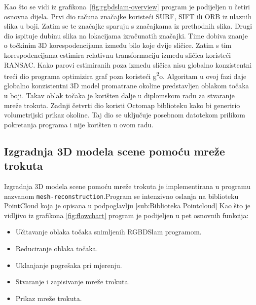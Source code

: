 
Kao što se vidi iz grafikona~\ref{fig:rgbdslam-overview} program je
podijeljen u četiri osnovna dijela. Prvi dio računa značajke koristeći
SURF, SIFT ili ORB iz ulaznih slika u boji. Zatim se te značajke sparuju
s značajkama iz prethodnih slika. Drugi dio ispituje dubinu slika na
lokacijama izračunatih značajki. Time dobiva znanje o točkinim 3D
korespodencijama između bilo koje dvije sličice. Zatim s tim
korespodencijama estimira relativnu transformaciju između sličica
koristeći RANSAC. Kako parovi estimiranih poza između sličica nisu
globalno konzistentni treći dio programa optimizira graf poza koristeći
g\textsuperscript{2}o. Algoritam u ovoj fazi daje globalno konzistentni
3D model promatrane okoline predstavljen oblakom točaka u boji. Takav
oblak točaka je korišten dalje u diplomskom radu za stvaranje mreže
trokuta. Zadnji četvrti dio koristi Octomap biblioteku kako bi generirio
volumetrijski prikaz okoline. Taj dio se uključuje posebnom datotekom
prilikom pokretanja programa i nije korišten u ovom radu.




\newpage
\setcounter{figure}{0}
\subsection{Izgradnja 3D modela scene pomoću mreže trokuta} %
\label{sub:Izgradnja 3D modela scene pomoću mreže trokuta}

Izgradnja 3D modela scene pomoću mreže trokuta je implementirana u
programu nazvanom \texttt{mesh-reconstruction}.\footnotemark[1]
Program se intenzivno oslanja na biblioteku PointCloud koja je opisana u
podpoglavlju \ref{sub:Biblioteka Pointcloud} Kao što je vidljivo iz
grafikona \ref{fig:flowchart} program je podijeljen u pet osnovnih
funkcija:
\begin{itemize}
    \item Učitavanje oblaka točaka snimljenih RGBDSlam programom.
    \item Reduciranje oblaka točaka.
    \item Uklanjanje pogrešaka pri mjerenju.
    \item Stvaranje i zapisivanje mreže trokuta.
    \item Prikaz mreže trokuta.
\end{itemize}


